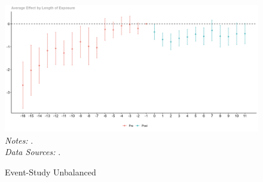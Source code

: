 

\begin{figure}[H]
\caption{Event-Study Unbalanced}
\centering
\begin{minipage}{\textwidth} %
 \includegraphics[width=\textwidth]{../../results/figures/figA1_eventStudyUnbalanced.png}
\scriptsize
\RaggedRight
\textit{Notes:} . \\
\textit{Data Sources:} \citep{mma2017list, inpe2020prodes}.
\end{minipage}
\label{fig:eventStudyUnbalanced}
\end{figure}
